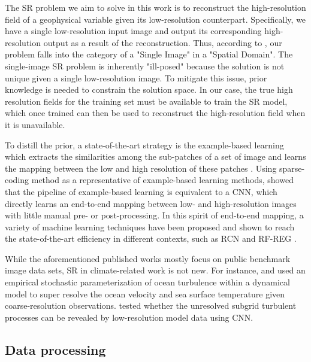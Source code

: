 \documentclass[]{copernicus}
\begin{document}
The SR problem we aim to solve in this work is to reconstruct the high-resolution field of a geophysical variable given its low-resolution counterpart. Specifically, we have a single low-resolution input image and output its corresponding high-resolution output as a result of the reconstruction. Thus, according to \cite{nasrollahi2014super}, our problem falls into the category of a "Single Image" in a "Spatial Domain". The single-image SR problem is inherently "ill-posed" because the solution is not unique given a single low-resolution image. To mitigate this issue, prior knowledge is needed to constrain the solution space. In our case, the true high resolution fields for the training set must be available to train the SR model, which once trained can then be used to reconstruct the high-resolution field when it is unavailable.

To distill the prior, a state-of-the-art strategy is the example-based learning \citep{freeman2002example} which extracts the similarities among the sub-patches of a set of image and learns the mapping between the low and high resolution of these patches \citep{yang2014single}. Using sparse-coding method \citep{yang2010image} as a representative of example-based learning methods, \cite{dong2015image} showed that the pipeline of example-based learning is equivalent to a CNN, which directly learns an end-to-end mapping between low- and high-resolution images with little manual pre- or post-processing. In this spirit of end-to-end mapping, a variety of machine learning techniques have been proposed and shown to reach the state-of-the-art efficiency in different contexts, such as RCN \citep{kim2016deeply} and RF-REG \citep{schulter2015fast,dou2018medical}.

While the aforementioned published works mostly focus on public benchmark image data sets, SR in climate-related work is not new. For instance, \cite{keating2012new} and \cite{keating2015upper} used an empirical stochastic parameterization of ocean turbulence within a dynamical model to super resolve the ocean velocity and sea surface temperature given coarse-resolution observations. \cite{bolton2019applications} tested whether the unresolved subgrid turbulent processes can be revealed by low-resolution model data using CNN.

\subsection{Data processing}
\end{document}
